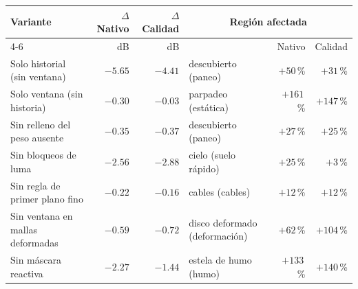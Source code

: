 \begin{tabular}{lrrlrr}
\toprule
Variante & $\Delta$ Nativo & $\Delta$ Calidad & \multicolumn{3}{c}{Regi\'on afectada} \\
\cmidrule(lr){4-6}
 & dB & dB & & Nativo & Calidad \\
\midrule
Solo historial (sin ventana) & $-5.65$ & $-4.41$ & descubierto (paneo) & $+50$\,\% & $+31$\,\% \\
Solo ventana (sin historia) & $-0.30$ & $-0.03$ & parpadeo (est\'atica) & $+161$\,\% & $+147$\,\% \\
Sin relleno del peso ausente & $-0.35$ & $-0.37$ & descubierto (paneo) & $+27$\,\% & $+25$\,\% \\
Sin bloqueos de luma & $-2.56$ & $-2.88$ & cielo (suelo r\'apido) & $+25$\,\% & $+3$\,\% \\
Sin regla de primer plano fino & $-0.22$ & $-0.16$ & cables (cables) & $+12$\,\% & $+12$\,\% \\
Sin ventana en mallas deformadas & $-0.59$ & $-0.72$ & disco deformado (deformaci\'on) & $+62$\,\% & $+104$\,\% \\
Sin m\'ascara reactiva & $-2.27$ & $-1.44$ & estela de humo (humo) & $+133$\,\% & $+140$\,\% \\
\bottomrule
\end{tabular}

